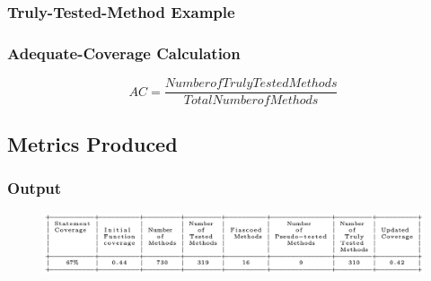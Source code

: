 \begin{frame}
  \frametitle{Truly-Tested-Method Example}
  \begin{center}

  \begin{table}[htbp]

  \end{table}

  \end{center}
\end{frame}

\begin{frame}
\frametitle{Adequate-Coverage Calculation}
\begin{center}
  \begin{equation*}
    AC = \frac{Number of TrulyTested Methods}{Total Number of Methods}
  \end{equation*}
\end{center}
\end{frame}

\subsection{Metrics Produced}
\begin{frame}
  \frametitle{Output}

    \begin{figure}
    \includegraphics[scale = .55]{images/tableOutput}
    \end{figure}
\end{frame}
